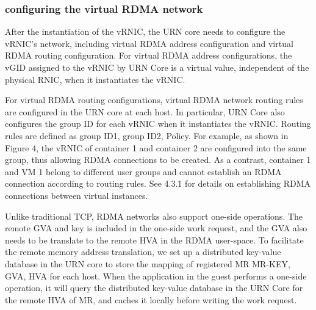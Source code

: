 \subsubsection{configuring the virtual RDMA network}

After the instantiation of the vRNIC, the URN core needs to configure the vRNIC's network, including virtual RDMA address configuration and virtual RDMA routing configuration.
For virtual RDMA address configurations, the vGID assigned to the vRNIC by URN Core is a virtual value, independent of the physical RNIC, when it instantiates the vRNIC.


For virtual RDMA routing configurations, virtual RDMA network routing rules are configured in the URN core at each host. In particular, URN Core also configures the group ID for each vRNIC when it instantiates the vRNIC. Routing rules are defined as {group ID1, group ID2, Policy}. For example, as shown in Figure 4, the vRNIC of container 1 and container 2 are configured into the same group, thus allowing RDMA connections to be created. As a contrast, container 1 and VM 1 belong to different user groups and cannot establish an RDMA connection according to routing rules. See 4.3.1 for details on establishing RDMA connections between virtual instances.

Unlike traditional TCP, RDMA networks also support one-side operations. The remote GVA and key is included in the one-side work request, and the GVA also needs to be translate to the remote HVA in the RDMA user-space. To facilitate the remote memory address translation, we set up a distributed key-value database in the URN core to store the mapping of registered MR {MR-KEY, GVA, HVA} for each host. When the application in the guest performs a one-side operation, it will query the distributed key-value database in the URN Core for the remote HVA of MR, and caches it locally before writing the work request.

